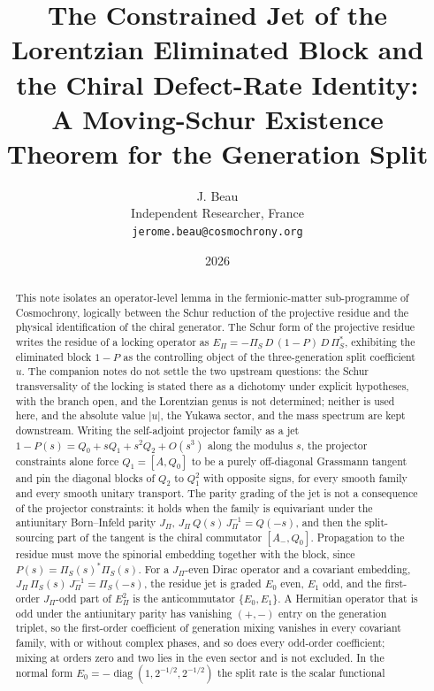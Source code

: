 \documentclass[11pt]{article}
\title{
  The Constrained Jet of the Lorentzian Eliminated Block and the Chiral Defect-Rate Identity:\\
  A Moving-Schur Existence Theorem for the Generation Split
}
\author{J. Beau\\
Independent Researcher, France\\
\texttt{jerome.beau@cosmochrony.org}}
\date{2026}
\theoremstyle{definition}
\theoremstyle{remark}
\newcommand{\JPi}{J_{\Pi}}
\newcommand{\Epi}{E_{\Pi}}
\newcommand{\PiS}{\Pi_{S}}
\newcommand{\diag}{\operatorname{diag}}
\begin{document}
  \maketitle

  \begin{abstract}
    This note isolates an operator-level lemma in the fermionic-matter sub-programme of Cosmochrony, logically between
    the Schur reduction of the projective residue and the physical identification of the chiral generator.
    The Schur form of the projective residue writes the residue of a locking operator as
    $\Epi = -\PiS\,D\,(1-P)\,D\,\PiS^{*}$, exhibiting the eliminated block $1-P$ as the controlling object of the
    three-generation split coefficient $u$.
    The companion notes do not settle the two upstream questions: the Schur transversality of the locking is stated there
    as a dichotomy under explicit hypotheses, with the branch open, and the Lorentzian genus is not determined; neither
    is used here, and the absolute value $|u|$, the Yukawa sector, and the mass spectrum are kept downstream.
    Writing the self-adjoint projector family as a jet $1-P(s) = Q_0 + s Q_1 + s^2 Q_2 + O(s^3)$ along the modulus $s$,
    the projector constraints alone force $Q_1 = [A, Q_0]$ to be a purely off-diagonal Grassmann tangent and pin the
    diagonal blocks of $Q_2$ to $Q_1^2$ with opposite signs, for every smooth family and every smooth unitary transport.
    The parity grading of the jet is not a consequence of the projector constraints: it holds when the family is
    equivariant under the antiunitary Born--Infeld parity $\JPi$, $\JPi\,Q(s)\,\JPi^{-1} = Q(-s)$, and then the
    split-sourcing part of the tangent is the chiral commutator $[A_-, Q_0]$.
    Propagation to the residue must move the spinorial embedding together with the block, since
    $P(s) = \PiS(s)^{*}\PiS(s)$.
    For a $\JPi$-even Dirac operator and a covariant embedding, $\JPi\,\PiS(s)\,\JPi^{-1} = \PiS(-s)$, the residue jet
    is graded $E_0$ even, $E_1$ odd, and the first-order $\JPi$-odd part of $\Epi^2$ is the anticommutator
    $\{E_0, E_1\}$.
    A Hermitian operator that is odd under the antiunitary parity has vanishing $(+,-)$ entry on the generation
    triplet, so the first-order coefficient of generation mixing vanishes in every covariant family, with or without
    complex
    phases, and so does every odd-order coefficient; mixing at orders zero and two lies in the even sector and is not
    excluded.
    In the normal form $E_0 = -\diag(1, 2^{-1/2}, 2^{-1/2})$ the split rate is the scalar functional

\end{abstract}
\end{document}
